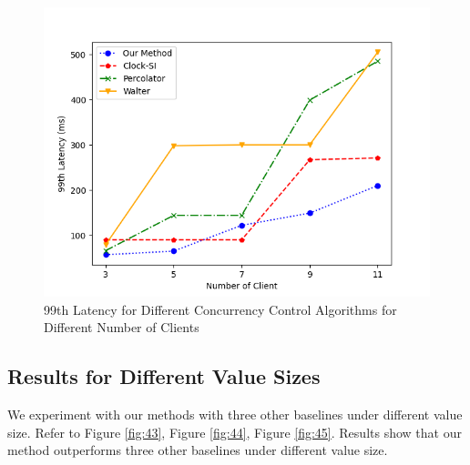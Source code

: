 \begin{figure}[H]
    \centering
    \includegraphics[width=0.8\linewidth]{figure/42.png}
    \caption{99th Latency for Different Concurrency Control Algorithms for Different Number of Clients}
    \label{fig:42}
\end{figure}



\subsection{Results for Different Value Sizes}
We experiment with our methods with three other baselines under different value size. Refer to Figure \ref{fig:43}, Figure \ref{fig:44}, Figure \ref{fig:45}. Results show that our method outperforms three other baselines under different value size.

